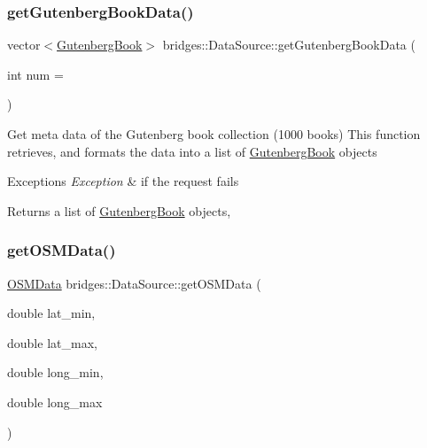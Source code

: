 \subsubsection{\texorpdfstring{getGutenbergBookData()}{getGutenbergBookData()}}
{\footnotesize\ttfamily vector$<$\mbox{\hyperlink{classbridges_1_1_gutenberg_book}{Gutenberg\+Book}}$>$ bridges\+::\+Data\+Source\+::get\+Gutenberg\+Book\+Data (\begin{DoxyParamCaption}\item[{int}]{num = {} }\end{DoxyParamCaption})\hspace{0.3cm}{\ttfamily [inline]}}

Get meta data of the Gutenberg book collection (1000 books) This function retrieves, and formats the data into a list of \mbox{\hyperlink{classbridges_1_1_gutenberg_book}{Gutenberg\+Book}} objects


\begin{DoxyExceptions}{Exceptions}
{\em Exception} & if the request fails\\
\hline
\end{DoxyExceptions}
\begin{DoxyReturn}{Returns}
a list of \mbox{\hyperlink{classbridges_1_1_gutenberg_book}{Gutenberg\+Book}} objects, 
\end{DoxyReturn}
\mbox{\label{classbridges_1_1_data_source_a185c723a4f6d25812f9d64323775faaa}} 
\subsubsection{\texorpdfstring{getOSMData()}{getOSMData()}\hspace{0.1cm}{\footnotesize\ttfamily [1/2]}}
{\footnotesize\ttfamily \mbox{\hyperlink{classbridges_1_1_o_s_m_data}{O\+S\+M\+Data}} bridges\+::\+Data\+Source\+::get\+O\+S\+M\+Data (\begin{DoxyParamCaption}\item[{double}]{lat\+\_\+min,  }\item[{double}]{lat\+\_\+max,  }\item[{double}]{long\+\_\+min,  }\item[{double}]{long\+\_\+max }\end{DoxyParamCaption})\hspace{0.3cm}{\ttfamily [inline]}}

